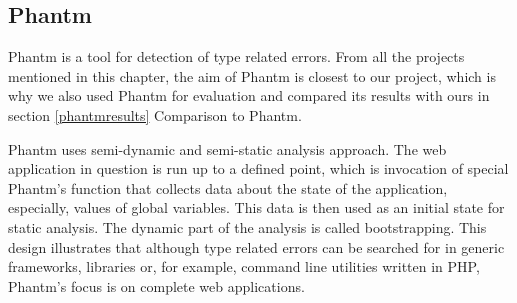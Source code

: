     \subsection{Phantm}
    
    Phantm\cite{kneuss2010phantm} is a tool for detection of type related 
    errors. From all the projects mentioned in this chapter, the aim of 
    Phantm is closest to our project, which is why we also used Phantm 
    for evaluation and compared its results with ours in 
    section \ref{phantmresults} Comparison to Phantm.
    
    Phantm uses semi-dynamic and semi-static analysis approach. The web 
    application in question is run up to a defined point, which is invocation 
    of special Phantm's function that collects data about the state of the application, 
    especially, values of global variables. This data is then used as an initial 
    state for static analysis. The dynamic part of the analysis is called bootstrapping. 
    This design illustrates that although type related errors can be searched for 
    in generic frameworks, libraries or, for example, command line utilities 
    written in PHP, Phantm's focus is on complete web applications.
    
